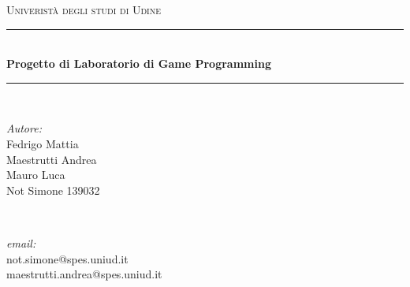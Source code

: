 \documentclass[12pt]{article}
\begin{document}
\begin{titlepage}

\newcommand{\HRule}{\rule{\linewidth}{0.5mm}} %

\center %
 

\textsc{\LARGE Univeristà degli studi di Udine}\\[1.5cm] %


\HRule \\[0.4cm]
{ \huge \bfseries Progetto di Laboratorio di Game Programming}\\[0.4cm] %
\HRule \\[1.5cm]
 

\begin{minipage}{0.4\textwidth}
\begin{flushleft} \large
\emph{Autore:}\\
Fedrigo Mattia\\
Maestrutti Andrea\\
Mauro Luca\\
Not Simone 139032\\

\end{flushleft}
\end{minipage}
~
\begin{minipage}{0.4\textwidth}
\begin{flushright} 
\emph{email:}\\
not.simone@spes.uniud.it\\
maestrutti.andrea@spes.uniud.it
\end{flushright}
\end{minipage}\\[2cm]



\end{titlepage}
\end{document}
